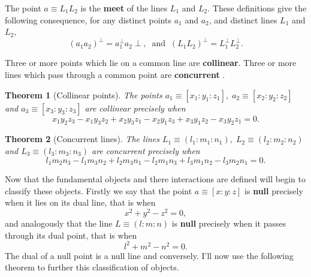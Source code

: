 \documentclass{unswthesis}
\newtheorem{theorem}{Theorem}
\begin{document}
The point $a\equiv L_{1}L_{2}$ is the \textbf{meet} of the lines $L_{1}$ and 
$L_{2}$. These definitions give the following consequence, for any distinct
points $a_{1}$ and $a_{2}$, and distinct lines $L_{1}$ and $L_{2}$, 
\begin{equation*}
(a_{1}a_{2})^{\perp}=a_{1}^{\perp}a_{2}\perp,\;\;\text{and}%
\;\;(L_{1}L_{2})^{\perp}=L_{1}^{\perp}L_{2}^{\perp}. 
\end{equation*}

Three or more points which lie on a common line are \textbf{collinear}.
Three or more lines which pass through a common point are \textbf{concurrent}%
.\newline

\begin{theorem}[Collinear points]
The points $a_{1}\equiv[x_{1}:y_{1}:z_{1}],\; a_{2}\equiv[x_{2}:y_{2}:z_{2}]$
and $a_{3}\equiv[x_{3}:y_{3}:z_{3}]$ are collinear precisely when 
\begin{equation*}
x_{1}y_{2}z_{3}-x_{1}y_{3}z_{2}+x_{2}y_{3}z_{1}-x_{2}y_{1}z_{3}+x_{3}y_{1}z_{2}-x_{3}y_{2}z_{1}=0. 
\end{equation*}
\end{theorem}

\begin{theorem}[Concurrent lines]
The lines $L_{1}\equiv(l_{1}:m_{1}:n_{1}),\; L_{2}\equiv(l_{2}:m_{2}:n_{2})$
and $L_{3}\equiv(l_{3}:m_{3}:n_{3})$ are concurrent precisely when 
\begin{equation*}
l_{1}m_{2}n_{3}-l_{1}m_{3}n_{2}+l_{2}m_{3}n_{1}-l_{2}m_{1}n_{3}+l_{3}m_{1}n_{2}-l_{3}m_{2}n_{1}=0. 
\end{equation*}
\end{theorem}

Now that the fundamental objects and there interactions are defined will
begin to classify these objects. Firstly we say that the point $a\equiv[x:y:z%
]$ is \textbf{null} precisely when it lies on its dual line, that is when 
\begin{equation*}
x^{2}+y^{2}-z^{2}=0, 
\end{equation*}
and analogously that the line $L\equiv(l:m:n)$ is \textbf{null} precisely
when it passes through its dual point, that is when 
\begin{equation*}
l^{2}+m^{2}-n^{2}=0. 
\end{equation*}
The dual of a null point is a null line and conversely. I'll now use the
following theorem to further this classification of objects.\newline
\end{document}
